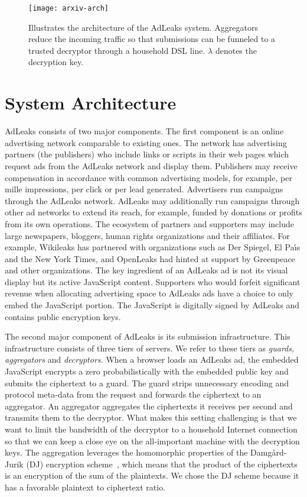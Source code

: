 \documentclass[twocolumn,10pt]{article}
\begin{document}
\begin{figure*}[t]
  \centering
  \texttt{[image: arxiv-arch]}
  \caption{Illustrates the architecture of the AdLeaks system.  Aggregators
    reduce the incoming traffic so that submissions can be funneled to a
    trusted decryptor through a household DSL line.  $\lambda$ denotes the
    decryption key.}
  \label{fig:arch}
\end{figure*}


\section{System Architecture}

AdLeaks consists of two major components.  The first component is an online
advertising network comparable to existing ones.  The network has
advertising partners (the publishers) who include links or scripts in their
web pages which request ads from the AdLeaks network and display them.
Publishers may receive compensation in accordance with common advertising
models, for example, per mille impressions, per click or per lead generated.
Advertisers run campaigns through the AdLeaks network.  AdLeaks may
additionally run campaigns through other ad networks to extend its reach,
for example, funded by donations or profits from its own operations.  The
ecosystem of partners and supporters may include large newspapers, bloggers,
human rights organizations and their affiliates.  For example, Wikileaks has
partnered with organizations such as Der Spiegel, El Pa\'\i{}s and the New
York Times, and OpenLeaks had hinted at support by Greenpeace and other
organizations.  The key ingredient of an AdLeaks ad is not its visual
display but its active JavaScript content.  Supporters who would forfeit
significant revenue when allocating advertising space to AdLeaks ads have a
choice to only embed the JavaScript portion.  The JavaScript is digitally
signed by AdLeaks and contains public encryption keys.

The second major component of AdLeaks is its submission infrastructure.
This infrastructure consists of three tiers of servers.  We refer to these
tiers as \emph{guards, aggregators} and \emph{decryptors.}  When a browser
loads an AdLeaks ad, the embedded JavaScript encrypts a zero
probabilistically with the embedded public key and submits the ciphertext to
a guard.  The guard strips unnecessary encoding and protocol meta-data from
the request and forwards the ciphertext to an aggregator.  An aggregator
aggregates the ciphertexts it receives per second and transmits them to the
decryptor.  What makes this setting challenging is that we want to limit the
bandwidth of the decryptor to a household Internet connection so that we can
keep a close eye on the all-important machine with the decryption keys.  The
aggregation leverages the homomorphic properties of the Damg\aa{}rd-Jurik
(DJ) encryption scheme~\cite{DamgardJN2010}, which means that the product of
the ciphertexts is an encryption of the sum of the plaintexts.  We chose the
DJ scheme because it has a favorable plaintext to ciphertext ratio.
\end{document}
